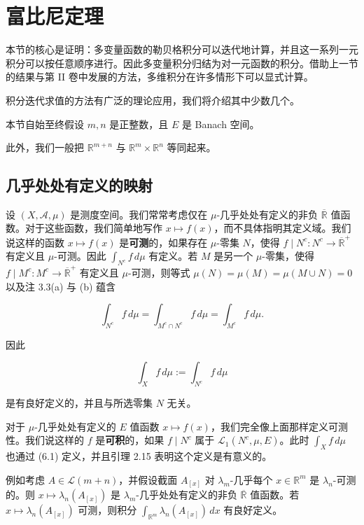 \section{富比尼定理}

本节的核心是证明：多变量函数的勒贝格积分可以迭代地计算，并且这一系列一元积分可以按任意顺序进行。因此多变量积分归结为对一元函数的积分。借助上一节的结果与第 II 卷中发展的方法，多维积分在许多情形下可以显式计算。

积分迭代求值的方法有广泛的理论应用，我们将介绍其中少数几个。

本节自始至终假设 $ m, n $ 是正整数，且 $ E $ 是 Banach 空间。

此外，我们一般把 $ \mathbb{R}^{m+n} $ 与 $ \mathbb{R}^m \times \mathbb{R}^n $ 等同起来。

\subsection*{几乎处处有定义的映射}

设 $ (X, \mathcal{A}, \mu) $ 是测度空间。我们常常考虑仅在 $ \mu $-几乎处处有定义的非负 $ \overline{\mathbb{R}} $ 值函数。对于这些函数，我们简单地写作 $ x \mapsto f(x) $，而不具体指明其定义域。我们说这样的函数 $ x \mapsto f(x) $ 是\textbf{可测}的，如果存在 $ \mu $-零集 $ N $，使得 $ f \mid N^{c} : N^{c} \to \overline{\mathbb{R}}^{+} $ 有定义且 $ \mu $-可测。因此 $ \int_{N^{c}} f \, d\mu $ 有定义。若 $ M $ 是另一个 $ \mu $-零集，使得 $ f \mid M^{c} : M^{c} \to \overline{\mathbb{R}}^{+} $ 有定义且 $ \mu $-可测，则等式 $ \mu(N) = \mu(M) = \mu(M \cup N) = 0 $ 以及注 3.3(a) 与 (b) 蕴含

\[
\int_{N^{c}} f \, d\mu = \int_{M^{c} \cap N^{c}} f \, d\mu = \int_{M^{c}} f \, d\mu .
\]

因此

\begin{equation}
\int_{X} f \, d\mu := \int_{N^{c}} f \, d\mu\tag{6.1}
\end{equation}

是有良好定义的，并且与所选零集 $ N $ 无关。

对于 $ \mu $-几乎处处有定义的 $ E $ 值函数 $ x \mapsto f(x) $，我们完全像上面那样定义可测性。我们说这样的 $ f $ 是\textbf{可积}的，如果 $ f \mid N^{c} $ 属于 $ \mathcal{L}_{1}(N^{c}, \mu, E) $。此时 $ \int_{X} f \, d\mu $ 也通过 (6.1) 定义，并且引理 2.15 表明这个定义是有意义的。

例如考虑 $ A \in \mathcal{L}(m+n) $，并假设截面 $ A_{[x]} $ 对 $ \lambda_m $-几乎每个 $ x \in \mathbb{R}^m $ 是 $ \lambda_n $-可测的。则 $ x \mapsto \lambda_n(A_{[x]}) $ 是 $ \lambda_m $-几乎处处有定义的非负 $ \overline{\mathbb{R}} $ 值函数。若 $ x \mapsto \lambda_n(A_{[x]}) $ 可测，则积分 $ \int_{\mathbb{R}^m} \lambda_n(A_{[x]}) \, dx $ 有良好定义。

